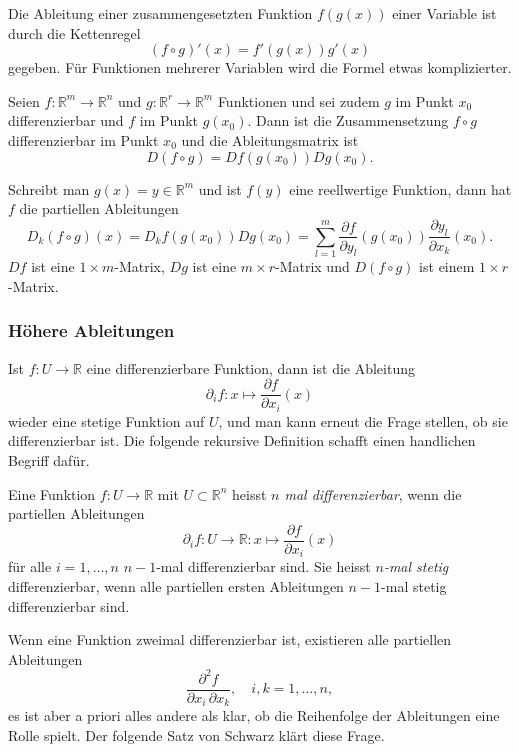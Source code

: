 Die Ableitung einer zusammengesetzten Funktion $f(g(x))$ einer 
Variable ist durch die Kettenregel
\[
(f\circ g)'(x)
=
f'(g(x)) g'(x)
\]
gegeben.
Für Funktionen mehrerer Variablen wird die Formel etwas komplizierter.

\begin{satz}
Seien $f\colon \mathbb{R}^m\to\mathbb{R}^n$ und
$g\colon\mathbb{R}^r\to\mathbb{R}^m$ Funktionen und sei zudem
$g$ im Punkt $x_0$ differenzierbar und $f$ im Punkt $g(x_0)$.
Dann ist die Zusammensetzung $f\circ g$ differenzierbar im Punkt $x_0$
und die Ableitungsmatrix ist
\[
D(f\circ g) = Df(g(x_0)) Dg(x_0).
\]
\end{satz}

Schreibt man $g(x)=y\in\mathbb{R}^m$ und ist $f(y)$ eine reellwertige Funktion,
dann hat $f$ die partiellen Ableitungen
\[
D_k(f\circ g)(x)
=
D_kf(g(x_0)) Dg(x_0)
=
\sum_{l=1}^m
\frac{\partial f}{\partial y_l}(g(x_0))
\frac{\partial y_l}{\partial x_k}(x_0).
\]
$Df$ ist eine $1\times m$-Matrix, $Dg$ ist eine $m\times r$-Matrix und
$D(f\circ g)$ ist einem $1\times r$-Matrix.

%
%
\subsubsection{Höhere Ableitungen}
Ist $f\colon U\to\mathbb{R}$ eine differenzierbare Funktion, dann ist
die Ableitung
\[
\partial_if\colon x\mapsto \frac{\partial f}{\partial x_i}(x)
\]
wieder eine stetige Funktion auf $U$, und man kann erneut die Frage
stellen, ob sie differenzierbar ist.
Die folgende rekursive Definition schafft einen handlichen Begriff
dafür.

\begin{definition}
Eine Funktion $f\colon U\to\mathbb{R}$ mit $U\subset\mathbb{R}^n$ heisst
{\em $n$ mal differenzierbar}, wenn die partiellen Ableitungen
\[
\partial_i f
\colon
U\to\mathbb{R}
:
x\mapsto
\frac{\partial f}{\partial x_i}(x)
\]
für alle $i=1,\dots,n$ $n-1$-mal differenzierbar sind.
Sie heisst {\em $n$-mal stetig} differenzierbar, wenn alle partiellen
ersten Ableitungen $n-1$-mal stetig differenzierbar sind.
\end{definition}

Wenn eine Funktion zweimal differenzierbar ist, existieren alle
partiellen Ableitungen
\[
\frac{\partial^2 f}{\partial x_i\,\partial x_k},
\quad
i,k=1,\dots,n,
\]
es ist aber a priori alles andere als klar, ob die Reihenfolge der
Ableitungen eine Rolle spielt.
Der folgende Satz von Schwarz klärt diese Frage.

